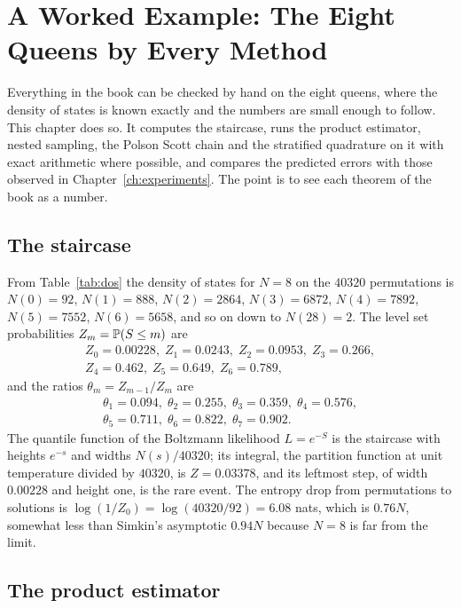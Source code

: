 \chapter{A Worked Example: The Eight Queens by Every Method}
\label{ch:worked}

Everything in the book can be checked by hand on the eight queens, where the density of states is known exactly and the numbers are small enough to follow. This chapter does so. It computes the staircase, runs the product estimator, nested sampling, the Polson Scott chain and the stratified quadrature on it with exact arithmetic where possible, and compares the predicted errors with those observed in Chapter~\ref{ch:experiments}. The point is to see each theorem of the book as a number.

\section{The staircase}

From Table~\ref{tab:dos} the density of states for $N = 8$ on the $40320$ permutations is $N(0) = 92$, $N(1) = 888$, $N(2) = 2864$, $N(3) = 6872$, $N(4) = 7892$, $N(5) = 7552$, $N(6) = 5658$, and so on down to $N(28) = 2$. The level set probabilities $Z_m = \mathbb{P}(S \le m)$ are
\[
\begin{gathered}
Z_0 = 0.00228, \; Z_1 = 0.0243, \; Z_2 = 0.0953, \; Z_3 = 0.266, \\ Z_4 = 0.462, \; Z_5 = 0.649, \; Z_6 = 0.789 ,
\end{gathered}
\]
and the ratios $\theta_m = Z_{m-1} / Z_m$ are
\[
\begin{gathered}
\theta_1 = 0.094, \; \theta_2 = 0.255, \; \theta_3 = 0.359, \; \theta_4 = 0.576, \\ \theta_5 = 0.711, \; \theta_6 = 0.822, \; \theta_7 = 0.902 .
\end{gathered}
\]
The quantile function of the Boltzmann likelihood $L = e^{-S}$ is the staircase with heights $e^{-s}$ and widths $N(s)/40320$; its integral, the partition function at unit temperature divided by $40320$, is $Z = 0.03378$, and its leftmost step, of width $0.00228$ and height one, is the rare event. The entropy drop from permutations to solutions is $\log(1/Z_0) = \log(40320/92) = 6.08$ nats, which is $0.76 N$, somewhat less than Simkin's asymptotic $0.94 N$ because $N = 8$ is far from the limit.

\section{The product estimator}

